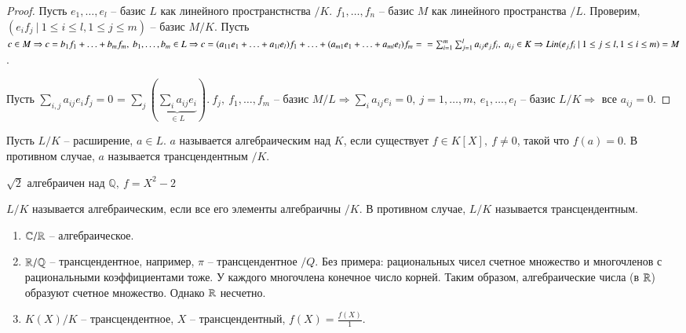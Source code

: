 \documentclass[main]{subfiles}
\begin{document}
\begin{proof}
    Пусть $e_1, \ldots , e_l $ -- базис $L$ как линейного пространстнства $/ K$.
    $f_1, \ldots , f_n$ -- базис $M$ как линейного пространства $/ L$. Проверим, 
    $(e_i f_j \ | \ 1 \leq i \leq l, 1 \leq j \leq m)$ -- базис $M / K$. Пусть $c \in M
    \Rightarrow c = b_1f_1 + \ldots + b_mf_m, \ b_1, \ldots, b_m \in L \Rightarrow 
        c = (a_{11}e_1 + \ldots + a_{1l}e_l)f_1 + \ldots + (a_{m1}e_1 + \ldots + a_{ml}e_l)f_m = \\
        = \sum^m_{i=1} \sum^l_{j=1} a_{ij}e_jf_i, \ a_{ij} \in K 
        \Rightarrow Lin(e_jf_i \ | \ 1 \leq j \leq l, 1 \leq i \leq m) = M$.

        Пусть $\sum_{i,j} a_{ij} e_if_j = 0 $ = 
         $\sum_{j} \left( \underbrace{\sum_{i} a_{ij} e_i}_{\in L} \right). \  f_j, \ f_1, \ldots, f_m \text{ -- базис } M / L 
         \Rightarrow \sum_i a_{ij}  e_i = 0, \ j = 1, \ldots, m, \ e_1, \ldots, e_l$ -- базис $L / K
         \Rightarrow$ все $a_{ij} = 0$.
   
\end{proof}

\begin{definition}
    Пусть $L / K$ -- расширение, $a \in L$. $a$ называется алгебраическим
    над $K$, если существует $f \in K[X], \ f \ne 0$, такой что $f(a) = 0 $. В противном случае, $a$
    называется трансцендентным $/ K$.
\end{definition}

\begin{example}
    $\sqrt{2}$ алгебраичен над $\mathbb{Q}, \ f = X^2-2$
\end{example}

$L / K$ называется алгебраическим, если все его элементы алгебраичны $/ K$.
В противном случае, $L / K$ называется трансцендентным.

\begin{example}
    \begin{enumerate}
        \item $ \mathbb{C} / \mathbb{R} $ -- алгебраическое.
        \item $\mathbb{R} / \mathbb{Q}$ -- трансцендентное, например, $\pi$ -- трансцендентное $/ Q$. Без примера: рациональных чисел счетное множество 
        и многочленов с рациональными коэффициентами тоже. У каждого многочлена конечное число корней.
        Таким образом, алгебраические числа (в $\mathbb{R}$) образуют счетное множество. Однако $\mathbb{R}$ несчетно.
        \item  $K(X) / K$ -- трансцендентное,  $X$ -- трансцендентный, $f(X) = \frac{f(X)}{1}$.
    \end{enumerate}
\end{example}
\end{document}
